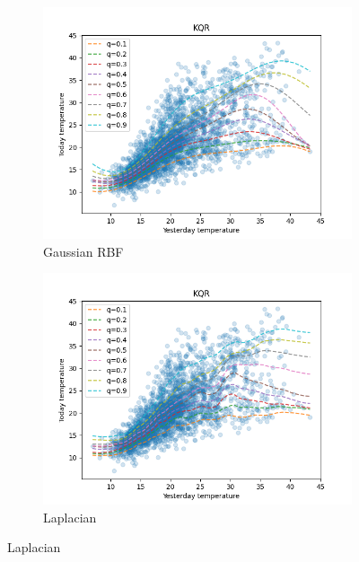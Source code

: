 \begin{figure}[!h]
    \begin{subfigure}[b]{0.5\linewidth}
        \centering
        \includegraphics[width=1.1\textwidth]{images/melborune_gaussian_rbf_kernel_quantile_regression.png} 
        \caption{Gaussian RBF} 
        \label{} 
        \vspace{4ex}
    \end{subfigure}%
    \begin{subfigure}[b]{0.5\linewidth}
        \centering
        \includegraphics[width=1.1\textwidth]{images/melborune_laplacian_kernel_quantile_regression.png} 
        \caption{Laplacian} 
        \label{} 
        \vspace{4ex}

\end{subfigure}
\end{figure}
